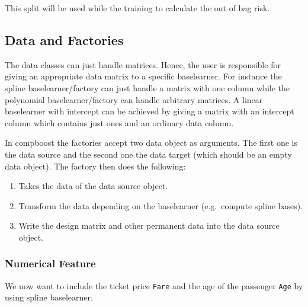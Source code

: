 \documentclass[]{article}
\providecommand{\tightlist}{%
  \setlength{\itemsep}{0pt}\setlength{\parskip}{0pt}}
\begin{document}
This split will be used while the training to calculate the out of bag
risk.

\subsection{Data and Factories}\label{data-and-factories}

The data classes can just handle matrices. Hence, the user is
responsible for giving an appropriate data matrix to a specific
baselearner. For instance the spline baselearner/factory can just handle
a matrix with one column while the polynomial baselearner/factory can
handle arbitrary matrices. A linear baselearner with intercept can be
achieved by giving a matrix with an intercept column which contains just
ones and an ordinary data column.

In compboost the factories accept two data object as arguments. The
first one is the data source and the second one the data target (which
should be an empty data object). The factory then does the following:

\begin{enumerate}
\def\labelenumi{\arabic{enumi}.}
\tightlist
\item
  Takes the data of the data source object.
\item
  Transform the data depending on the baselearner (e.g.~compute spline
  bases).
\item
  Write the design matrix and other permanent data into the data source
  object.
\end{enumerate}

\subsubsection{Numerical Feature}\label{numerical-feature}

We now want to include the ticket price \texttt{Fare} and the age of the
passenger \texttt{Age} by using spline baselearner.
\end{document}

